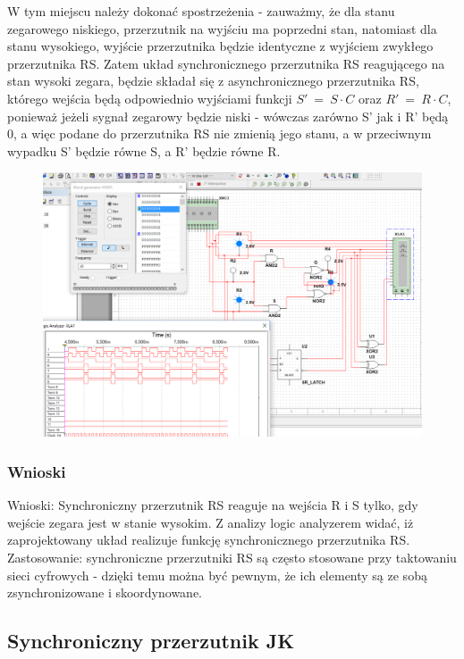 \documentclass[12pt,a4paper]{article}
\begin{document}
W tym miejscu należy dokonać spostrzeżenia - zauważmy, że dla stanu zegarowego niskiego, przerzutnik na wyjściu ma poprzedni stan, natomiast dla stanu wysokiego, wyjście przerzutnika będzie identyczne z wyjściem zwykłego przerzutnika RS. Zatem układ synchronicznego przerzutnika RS reagującego na stan wysoki zegara, będzie składał się z asynchronicznego przerzutnika RS, którego wejścia będą odpowiednio wyjściami funkcji $S' \ = \ S \cdot C$ oraz $R' \ = \ R \cdot C$, ponieważ jeżeli sygnał zegarowy będzie niski - wówczas zarówno S' jak i R' będą 0, a więc podane do przerzutnika RS nie zmienią jego stanu, a w przeciwnym wypadku S' będzie równe S, a R' będzie równe R.

\begin{figure}[H]
\centering
\includegraphics[width=\textwidth]{img/3b}
\end{figure}

\subsubsection{Wnioski}

Wnioski: Synchroniczny przerzutnik RS reaguje na wejścia R i S tylko, gdy wejście zegara jest w stanie wysokim. Z analizy logic analyzerem widać, iż zaprojektowany układ realizuje funkcję synchronicznego przerzutnika RS.
\\ 
Zastosowanie: synchroniczne przerzutniki RS są często stosowane przy taktowaniu sieci cyfrowych - dzięki temu można być pewnym, że ich elementy są ze sobą zsynchronizowane i skoordynowane.

\subsection{Synchroniczny przerzutnik JK}
\end{document}
